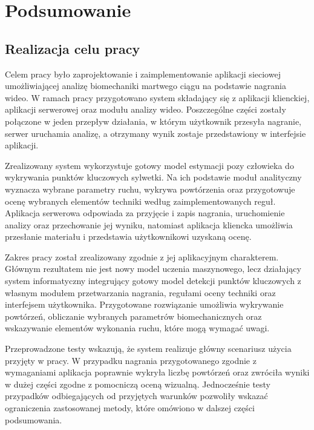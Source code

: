 \clearpage
\section*{Podsumowanie}

\subsection*{Realizacja celu pracy}

Celem pracy było zaprojektowanie i zaimplementowanie aplikacji sieciowej umożliwiającej analizę biomechaniki martwego ciągu na podstawie nagrania wideo. W ramach pracy przygotowano system składający się z aplikacji klienckiej, aplikacji serwerowej oraz modułu analizy wideo. Poszczególne części zostały połączone w jeden przepływ działania, w którym użytkownik przesyła nagranie, serwer uruchamia analizę, a otrzymany wynik zostaje przedstawiony w interfejsie aplikacji.

Zrealizowany system wykorzystuje gotowy model estymacji pozy człowieka do wykrywania punktów kluczowych sylwetki. Na ich podstawie moduł analityczny wyznacza wybrane parametry ruchu, wykrywa powtórzenia oraz przygotowuje ocenę wybranych elementów techniki według zaimplementowanych reguł. Aplikacja serwerowa odpowiada za przyjęcie i zapis nagrania, uruchomienie analizy oraz przechowanie jej wyniku, natomiast aplikacja kliencka umożliwia przesłanie materiału i przedstawia użytkownikowi uzyskaną ocenę.

Zakres pracy został zrealizowany zgodnie z jej aplikacyjnym charakterem. Głównym rezultatem nie jest nowy model uczenia maszynowego, lecz działający system informatyczny integrujący gotowy model detekcji punktów kluczowych z własnym modułem przetwarzania nagrania, regułami oceny techniki oraz interfejsem użytkownika. Przygotowane rozwiązanie umożliwia wykrywanie powtórzeń, obliczanie wybranych parametrów biomechanicznych oraz wskazywanie elementów wykonania ruchu, które mogą wymagać uwagi.

Przeprowadzone testy wskazują, że system realizuje główny scenariusz użycia przyjęty w pracy. W przypadku nagrania przygotowanego zgodnie z wymaganiami aplikacja poprawnie wykryła liczbę powtórzeń oraz zwróciła wyniki w dużej części zgodne z pomocniczą oceną wizualną. Jednocześnie testy przypadków odbiegających od przyjętych warunków pozwoliły wskazać ograniczenia zastosowanej metody, które omówiono w dalszej części podsumowania.

